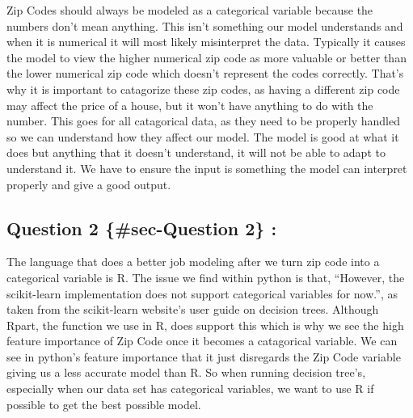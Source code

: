 \documentclass[
  letterpaper,
  DIV=11,
  numbers=noendperiod]{scrartcl}
\begin{document}
\begin{tcolorbox}
Zip Codes should always be modeled as a categorical variable because the
numbers don't mean anything. This isn't something our model understands
and when it is numerical it will most likely misinterpret the data.
Typically it causes the model to view the higher numerical zip code as
more valuable or better than the lower numerical zip code which doesn't
represent the codes correctly. That's why it is important to catagorize
these zip codes, as having a different zip code may affect the price of
a house, but it won't have anything to do with the number. This goes for
all catagorical data, as they need to be properly handled so we can
understand how they affect our model. The model is good at what it does
but anything that it doesn't understand, it will not be able to adapt to
understand it. We have to ensure the input is something the model can
interpret properly and give a good output.

\subsection{Question 2 \{\#sec-Question 2\}
:}\label{question-2-sec-question-2}

The language that does a better job modeling after we turn zip code into
a categorical variable is R. The issue we find within python is that,
``However, the scikit-learn implementation does not support categorical
variables for now.'', as taken from the scikit-learn website's user
guide on decision trees. Although Rpart, the function we use in R, does
support this which is why we see the high feature importance of Zip Code
once it becomes a catagorical variable. We can see in python's feature
importance that it just disregards the Zip Code variable giving us a
less accurate model than R. So when running decision tree's, especially
when our data set has categorical variables, we want to use R if
possible to get the best possible model.

\end{tcolorbox}
\end{document}
